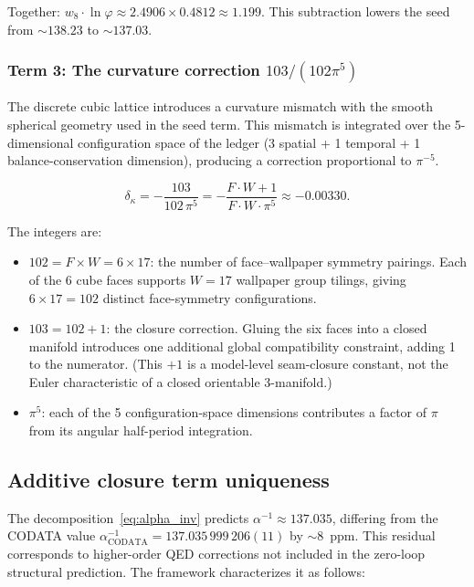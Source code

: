 \documentclass[11pt,a4paper]{article}
\theoremstyle{definition}
\theoremstyle{remark}
\newcommand{\phig}{\varphi}
\newcommand{\dkappa}{\delta_\kappa}
\newcommand{\weig}{w_8}
\begin{document}
Together: $\weig \cdot \ln\phig \approx 2.4906 \times 0.4812 \approx 1.199$.
This subtraction lowers the seed from $\sim 138.23$ to $\sim 137.03$.

\subsubsection{Term 3: The curvature correction $103/(102\pi^5)$}

The discrete cubic lattice introduces a curvature mismatch with the smooth
spherical geometry used in the seed term.  This mismatch is integrated over
the 5-dimensional configuration space of the ledger (3 spatial + 1 temporal +
1 balance-conservation dimension), producing a correction proportional to
$\pi^{-5}$.

\begin{equation}
  \dkappa = -\frac{103}{102\,\pi^5}
  = -\frac{F \cdot W + 1}{F \cdot W \cdot \pi^5}
  \approx -0.00330.
  \label{eq:curvature}
\end{equation}

The integers are:
\begin{itemize}[nosep]
  \item $102 = F \times W = 6 \times 17$: the number of face--wallpaper
        symmetry pairings.  Each of the 6 cube faces supports $W = 17$
        wallpaper group tilings, giving $6 \times 17 = 102$ distinct
        face-symmetry configurations.
  \item $103 = 102 + 1$: the closure correction.  Gluing the six faces into a
        closed manifold introduces one additional global compatibility
        constraint, adding 1 to the numerator.  (This $+1$ is a model-level
        seam-closure constant, not the Euler characteristic of a closed
        orientable 3-manifold.)
  \item $\pi^5$: each of the 5 configuration-space dimensions contributes a
        factor of $\pi$ from its angular half-period integration.
\end{itemize}

\subsection{Additive closure term uniqueness}

The decomposition~\eqref{eq:alpha_inv} predicts $\alpha^{-1} \approx 137.035$,
differing from the CODATA value $\alpha^{-1}_{\mathrm{CODATA}} =
137.035\,999\,206(11)$ by $\sim 8$~ppm.  This residual corresponds to
higher-order QED corrections not included in the zero-loop structural
prediction.  The framework characterizes it as follows:
\end{document}
